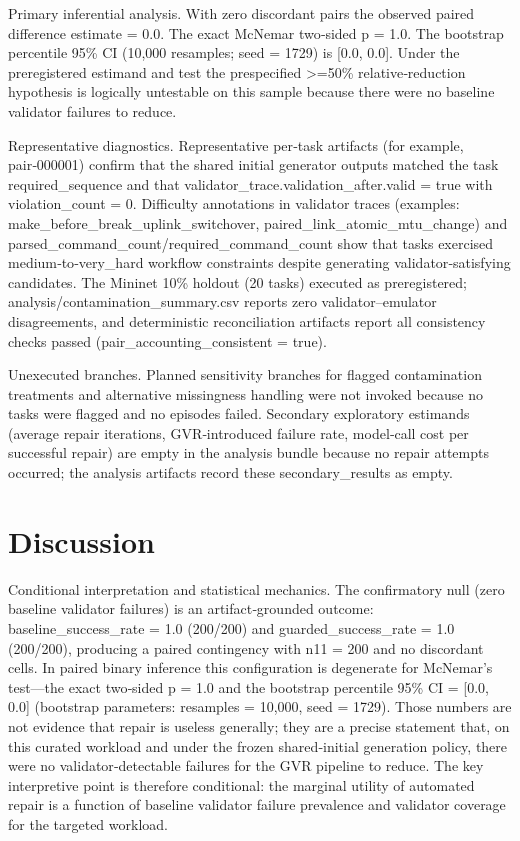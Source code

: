 \documentclass[conference]{IEEEtran}
\begin{document}
Primary inferential analysis. With zero discordant pairs the observed paired difference estimate = 0.0. The exact McNemar two‑sided p = 1.0. The bootstrap percentile 95\% CI (10,000 resamples; seed = 1729) is [0.0, 0.0]. Under the preregistered estimand and test the prespecified >=50\% relative‑reduction hypothesis is logically untestable on this sample because there were no baseline validator failures to reduce.

Representative diagnostics. Representative per‑task artifacts (for example, pair‑000001) confirm that the shared initial generator outputs matched the task required\_sequence and that validator\_trace.validation\_after.valid = true with violation\_count = 0. Difficulty annotations in validator traces (examples: make\_before\_break\_uplink\_switchover, paired\_link\_atomic\_mtu\_change) and parsed\_command\_count/required\_command\_count show that tasks exercised medium‑to‑very\_hard workflow constraints despite generating validator‑satisfying candidates. The Mininet 10\% holdout (20 tasks) executed as preregistered; analysis/contamination\_summary.csv reports zero validator--emulator disagreements, and deterministic reconciliation artifacts report all consistency checks passed (pair\_accounting\_consistent = true).

Unexecuted branches. Planned sensitivity branches for flagged contamination treatments and alternative missingness handling were not invoked because no tasks were flagged and no episodes failed. Secondary exploratory estimands (average repair iterations, GVR‑introduced failure rate, model‑call cost per successful repair) are empty in the analysis bundle because no repair attempts occurred; the analysis artifacts record these secondary\_results as empty.

\section{Discussion}
Conditional interpretation and statistical mechanics. The confirmatory null (zero baseline validator failures) is an artifact‑grounded outcome: baseline\_success\_rate = 1.0 (200/200) and guarded\_success\_rate = 1.0 (200/200), producing a paired contingency with n11 = 200 and no discordant cells. In paired binary inference this configuration is degenerate for McNemar's test---the exact two‑sided p = 1.0 and the bootstrap percentile 95\% CI = [0.0, 0.0] (bootstrap parameters: resamples = 10,000, seed = 1729). Those numbers are not evidence that repair is useless generally; they are a precise statement that, on this curated workload and under the frozen shared‑initial generation policy, there were no validator‑detectable failures for the GVR pipeline to reduce. The key interpretive point is therefore conditional: the marginal utility of automated repair is a function of baseline validator failure prevalence and validator coverage for the targeted workload.
\end{document}
